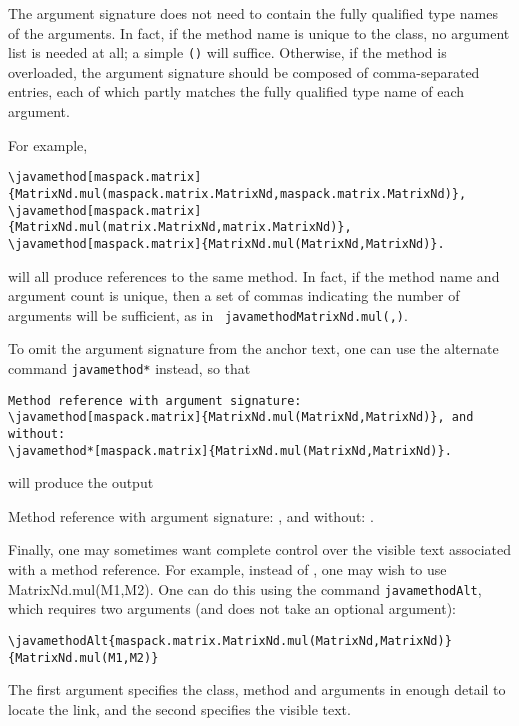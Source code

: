 \documentclass{article}
\begin{document}
The argument signature does not need to contain the fully qualified
type names of the arguments. In fact, if the method name is unique to
the class, no argument list is needed at all; a simple {\tt ()} will
suffice.  Otherwise, if the method is overloaded, the argument
signature should be composed of comma-separated entries, each of which
partly matches the fully qualified type name of each argument.

For example,

\begin{lstlisting}[]
\javamethod[maspack.matrix]{MatrixNd.mul(maspack.matrix.MatrixNd,maspack.matrix.MatrixNd)}, 
\javamethod[maspack.matrix]{MatrixNd.mul(matrix.MatrixNd,matrix.MatrixNd)},
\javamethod[maspack.matrix]{MatrixNd.mul(MatrixNd,MatrixNd)}.
\end{lstlisting}

will all produce references to the same method. In fact, if the method
name and argument count is unique, then a set of commas indicating the
number of arguments will be sufficient, as in {\tt
\BKS javamethod{MatrixNd.mul(,)}}.

To omit the argument signature from
the anchor text, one can use the alternate command {\tt \BKS javamethod*}
instead, so that

\begin{lstlisting}[]
Method reference with argument signature:
\javamethod[maspack.matrix]{MatrixNd.mul(MatrixNd,MatrixNd)}, and without:
\javamethod*[maspack.matrix]{MatrixNd.mul(MatrixNd,MatrixNd)}.
\end{lstlisting}

will produce the output

Method reference with argument signature:
, and without:
.

Finally, one may sometimes want complete control over the visible text
associated with a method reference. For example,
instead of ,
one may wish to use 
%
{MatrixNd.mul(M1,M2)}. One can do this using the command
{\tt javamethodAlt}, which requires two arguments (and does
not take an optional argument):
%
\begin{lstlisting}[]
\javamethodAlt{maspack.matrix.MatrixNd.mul(MatrixNd,MatrixNd)}{MatrixNd.mul(M1,M2)}
\end{lstlisting}
%
The first argument specifies the class, method and arguments in enough
detail to locate the link, and the second specifies the visible text.
\end{document}
